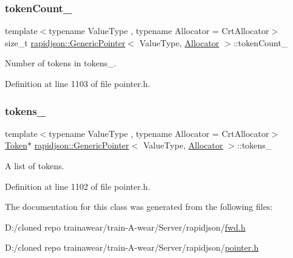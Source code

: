 \subsubsection{\texorpdfstring{tokenCount\_}{tokenCount\_}}
{\footnotesize\ttfamily template$<$typename Value\+Type , typename Allocator  = Crt\+Allocator$>$ \\
size\+\_\+t \mbox{\hyperlink{classrapidjson_1_1_generic_pointer}{rapidjson\+::\+Generic\+Pointer}}$<$ Value\+Type, \mbox{\hyperlink{classrapidjson_1_1_allocator}{Allocator}} $>$\+::token\+Count\+\_\+}



Number of tokens in tokens\+\_\+. 



Definition at line 1103 of file pointer.\+h.

\mbox{\label{classrapidjson_1_1_generic_pointer_ad76284430e5e54ed22a4c93dc59e00c7}} 
\subsubsection{\texorpdfstring{tokens\_}{tokens\_}}
{\footnotesize\ttfamily template$<$typename Value\+Type , typename Allocator  = Crt\+Allocator$>$ \\
\mbox{\hyperlink{structrapidjson_1_1_generic_pointer_1_1_token}{Token}}$\ast$ \mbox{\hyperlink{classrapidjson_1_1_generic_pointer}{rapidjson\+::\+Generic\+Pointer}}$<$ Value\+Type, \mbox{\hyperlink{classrapidjson_1_1_allocator}{Allocator}} $>$\+::tokens\+\_\+}



A list of tokens. 



Definition at line 1102 of file pointer.\+h.



The documentation for this class was generated from the following files\+:\begin{DoxyCompactItemize}
\item 
D\+:/cloned repo trainawear/train-\/\+A-\/wear/\+Server/rapidjson/\mbox{\hyperlink{fwd_8h}{fwd.\+h}}\item 
D\+:/cloned repo trainawear/train-\/\+A-\/wear/\+Server/rapidjson/\mbox{\hyperlink{pointer_8h}{pointer.\+h}}\end{DoxyCompactItemize}
